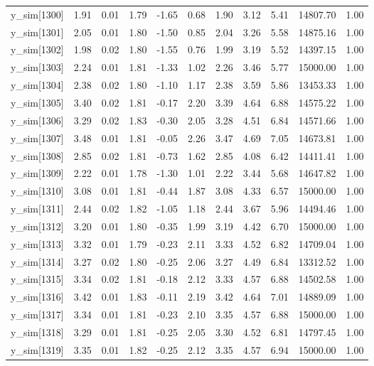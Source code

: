 \begin{table}[ht]
\begin{tabular}{rrrrrrrrrrr}
  y\_sim[1300] & 1.91 & 0.01 & 1.79 & -1.65 & 0.68 & 1.90 & 3.12 & 5.41 & 14807.70 & 1.00 \\ 
  y\_sim[1301] & 2.05 & 0.01 & 1.80 & -1.50 & 0.85 & 2.04 & 3.26 & 5.58 & 14875.16 & 1.00 \\ 
  y\_sim[1302] & 1.98 & 0.02 & 1.80 & -1.55 & 0.76 & 1.99 & 3.19 & 5.52 & 14397.15 & 1.00 \\ 
  y\_sim[1303] & 2.24 & 0.01 & 1.81 & -1.33 & 1.02 & 2.26 & 3.46 & 5.77 & 15000.00 & 1.00 \\ 
  y\_sim[1304] & 2.38 & 0.02 & 1.80 & -1.10 & 1.17 & 2.38 & 3.59 & 5.86 & 13453.33 & 1.00 \\ 
  y\_sim[1305] & 3.40 & 0.02 & 1.81 & -0.17 & 2.20 & 3.39 & 4.64 & 6.88 & 14575.22 & 1.00 \\ 
  y\_sim[1306] & 3.29 & 0.02 & 1.83 & -0.30 & 2.05 & 3.28 & 4.51 & 6.84 & 14571.66 & 1.00 \\ 
  y\_sim[1307] & 3.48 & 0.01 & 1.81 & -0.05 & 2.26 & 3.47 & 4.69 & 7.05 & 14673.81 & 1.00 \\ 
  y\_sim[1308] & 2.85 & 0.02 & 1.81 & -0.73 & 1.62 & 2.85 & 4.08 & 6.42 & 14411.41 & 1.00 \\ 
  y\_sim[1309] & 2.22 & 0.01 & 1.78 & -1.30 & 1.01 & 2.22 & 3.44 & 5.68 & 14647.82 & 1.00 \\ 
  y\_sim[1310] & 3.08 & 0.01 & 1.81 & -0.44 & 1.87 & 3.08 & 4.33 & 6.57 & 15000.00 & 1.00 \\ 
  y\_sim[1311] & 2.44 & 0.02 & 1.82 & -1.05 & 1.18 & 2.44 & 3.67 & 5.96 & 14494.46 & 1.00 \\ 
  y\_sim[1312] & 3.20 & 0.01 & 1.80 & -0.35 & 1.99 & 3.19 & 4.42 & 6.70 & 15000.00 & 1.00 \\ 
  y\_sim[1313] & 3.32 & 0.01 & 1.79 & -0.23 & 2.11 & 3.33 & 4.52 & 6.82 & 14709.04 & 1.00 \\ 
  y\_sim[1314] & 3.27 & 0.02 & 1.80 & -0.25 & 2.06 & 3.27 & 4.49 & 6.84 & 13312.52 & 1.00 \\ 
  y\_sim[1315] & 3.34 & 0.02 & 1.81 & -0.18 & 2.12 & 3.33 & 4.57 & 6.88 & 14502.58 & 1.00 \\ 
  y\_sim[1316] & 3.42 & 0.01 & 1.83 & -0.11 & 2.19 & 3.42 & 4.64 & 7.01 & 14889.09 & 1.00 \\ 
  y\_sim[1317] & 3.34 & 0.01 & 1.81 & -0.23 & 2.10 & 3.35 & 4.57 & 6.88 & 15000.00 & 1.00 \\ 
  y\_sim[1318] & 3.29 & 0.01 & 1.81 & -0.25 & 2.05 & 3.30 & 4.52 & 6.81 & 14797.45 & 1.00 \\ 
  y\_sim[1319] & 3.35 & 0.01 & 1.82 & -0.25 & 2.12 & 3.35 & 4.57 & 6.94 & 15000.00 & 1.00 \\ 

\end{tabular}
\end{table}

